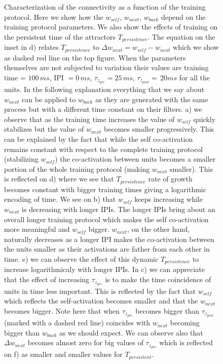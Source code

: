 \documentclass[10pt,a4paper]{article}
\begin{document}
\begin{figure}[H]
\caption{Characterization of the connectivity as a function of the training protocol. Here we show how the $w_{self}$, $w_{next}$, $w_{back}$ depend on the training protocol parameters. We also show the effects of training on the persistent time of the attractors $T_{persistence}$. The equation on the inset in d) relates $T_{persistence}$ to   $\Delta w_{next} = w_{self} - w_{next}$ which we show as dashed red line on the top figure. When the parameters themselves are not subjected to variation their values are training time = $100 \, ms$, IPI $= 0 \, ms$, $\tau_{z_{pre}}  = 25 \, ms$, $\tau_{z_{post}}= \, 20 ms$ for all the units. In the following explanation everything that we say about $w_{next}$ can be applied to $w_{back}$ as they are generated with the same process but with a different time constant on their filters. a) we observe that as the training time increases the value of $w_{self}$ quickly stabilizes but the value of $w_{next}$ becomes smaller progressively. This can be explained by the fact that while the self co-activation remains constant with respect to the complete training protocol (stabilizing $w_{self}$) the co-activation between units becomes a smaller portion of the whole training protocol (making $w_{next}$ smaller). This is reflected on d) where we see that $T_{persistence}$ rate of growth becomes constant with bigger training times giving a logarithmic encoding of time.  We see on b) that $w_{self}$ keeps increasing while $w_{next}$ is decreasing with longer IPIs. The longer IPIs bring about an overall longer training protocol which makes the self co-activation more meaningful and $w_{self}$ bigger. $w_{next}$, on the other hand, naturally decreases as a longer IPI makes the co-activation between the units smaller as their activations are father from each other in time. e) we can observe the effect of this dynamic $T_{persistence}$ to increase logarithmicaly with longer IPIs. In c) we can appreciate that the effect of increasing $\tau_{z_{pre}}$ is to make the time coincidence of units in time less important. This is reflected by the fact that $w_{self}$ which reflects the self-activation becomes smaller and that the $w_{next}$ becomes bigger. Note here that when $\tau_{z_{pre}}$ becomes bigger than $\tau_{z_{post}}$ (marked with a dashed red line) coincides with $w_{next}$ becoming bigger than $w_{back}$ as we should expect. We can observe also that  $\Delta w_{next}$ becomes almost zero for big values of $\tau_{z_{pre}}$ which is reflected on f) as smaller and smaller values for $T_{persistent}$. }
\label{fig:training}
\end{figure}
\end{document}
